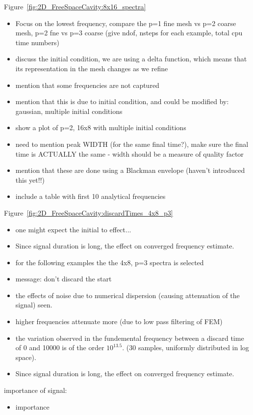 Figure~\ref{fig:2D_FreeSpaceCavity:8x16_spectra}
\begin{itemize}
\item Focus on the lowest frequency, compare the p=1 fine mesh vs p=2 coarse
  mesh, p=2 fne vs p=3 coarse (give ndof, nsteps for each example, total cpu time numbers)
\item discuss the initial condition, we are using a delta function, which means that its representation in the mesh changes as we refine
\item mention that some frequencies are not captured
\item mention that this is due to initial condition, and could be modified by: gaussian, multiple initial conditions
\item show a plot of p=2, 16x8 with multiple initial conditions
\item need to mention peak WIDTH (for the same final time?), make sure the final time is ACTUALLY the same - width should be a measure of quality factor
\item mention that these are done using a Blackman envelope (haven't introduced this yet!!)
\item include a table with first 10 analytical frequencies
\end{itemize}

Figure~\ref{fig:2D_FreeSpaceCavity:discardTimes_4x8_p3}
\begin{itemize}
\item one might expect the initial to effect...
\item Since signal duration is long, the effect on converged frequency estimate.
\item for the following examples the the 4x8, p=3 spectra is selected
\item message: don't discard the start
\item the effects of noise due to numerical dispersion (causing attenuation of the signal) seen.
\item higher frequencies attenuate more (due to low pass filtering of FEM)
\item the variation observed in the fundemental frequency between a discard time of 0 and 10000 is of the order $10^{13.5}$. (30 samples, uniformly distributed in log space).
\item Since signal duration is long, the effect on converged frequency estimate.
\end{itemize}

importance of signal:
\begin{itemize}
\item importance
\end{itemize}

